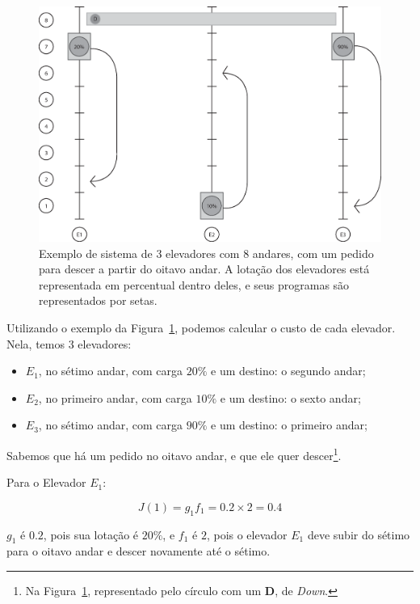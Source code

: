\begin{figure}[htb!]
  \centering
  \includegraphics[scale=0.6]{img/elevator_example1.eps}
  \caption{Exemplo de sistema de 3 elevadores com 8 andares, com um pedido para
    descer a partir do oitavo andar. A lotação dos elevadores está representada
    em percentual dentro deles, e seus programas são representados por setas.}
  \label{fig:elevadores-1}
\end{figure}

Utilizando o exemplo da Figura~\ref{fig:elevadores-1}, podemos calcular o custo
de cada elevador. Nela, temos 3 elevadores:

\begin{itemize}
\item \textbf{$E_{1}$}, no sétimo andar, com carga $20\%$ e um destino: o segundo andar;
\item \textbf{$E_{2}$}, no primeiro andar, com carga $10\%$ e um destino: o sexto andar;
\item \textbf{$E_{3}$}, no sétimo andar, com carga $90\%$ e um destino: o primeiro andar;
\end{itemize}

Sabemos que há um pedido no oitavo andar, e que ele quer descer\footnote{Na
  Figura~\ref{fig:elevadores-1}, representado pelo círculo com um \textbf{D}, de
\textit{Down}.}.

Para o Elevador $E_{1}$:

\[J(1) = g_{1}f_{1} = 0.2 \times 2 = 0.4\]

$g_{1}$ é $0.2$, pois sua lotação é $20\%$, e $f_{1}$ é $2$, pois o elevador
$E_{1}$ deve subir do sétimo para o oitavo andar e descer novamente até o sétimo.

